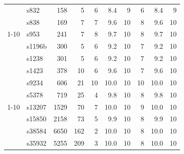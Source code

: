 \begin{table}[t]
\begin{tabular}{c l r r r r r r r r}
  & s832   &   158 &   5 &  6 &  8.4 & 9 &  6 &  8.4 & 9 \\
  & s838   &   169 &   7 &  7 &  9.6 & 10 &  8 &  9.6 & 10 \\
\cmidrule(lr){1-10}
\multirow{6}{*}{\rotatebox[origin=c]{90}{\textit{Medium}}}
  & s953   &   241 &   7 &  8 &  9.7 & 10 &  8 &  9.7 & 10 \\
  & s1196b &   300 &   5 &  6 &  9.2 & 10 &  7 &  9.2 & 10 \\
  & s1238  &   301 &   5 &  6 &  9.2 & 10 &  7 &  9.2 & 10 \\
  & s1423  &   378 &  10 &  6 &  9.6 & 10 &  7 &  9.6 & 10 \\
  & s9234  &   606 &  21 & 10 & 10.0 & 10 & 10 & 10.0 & 10 \\
  & s5378  &   719 &  25 &  4 &  9.8 & 10 &  8 &  9.8 & 10 \\
\cmidrule(lr){1-10}
\multirow{4}{*}{\rotatebox[origin=c]{90}{\textit{Large}}}
  & s13207 &  1529 &  70 &  7 & 10.0 & 10 &  9 & 10.0 & 10 \\
  & s15850 &  2158 &  73 &  5 &  9.9 & 10 &  8 &  9.9 & 10 \\
  & s38584 &  6650 & 162 &  2 & 10.0 & 10 &  8 & 10.0 & 10 \\
  & s35932 &  5255 & 209 &  3 & 10.0 & 10 &  8 & 10.0 & 10 \\
\bottomrule
\end{tabular}
\end{table}


